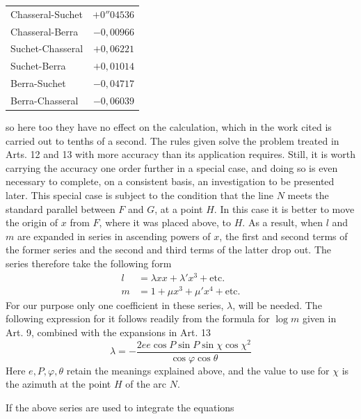 %
\begin{center}
\begin{tabular}{lr}
Chasseral-Suchet&\(+0''04536\)\\
Chasseral-Berra&\(-0{,}00966\)\\
Suchet-Chasseral&\(+0{,}06221\)\\
Suchet-Berra&\(+0{,}01014\)\\
Berra-Suchet&\(-0{,}04717\)\\
Berra-Chasseral&\(-0{,}06039\)
\end{tabular}
\end{center}
so here too they have no effect on the calculation, which in the work cited is carried out to tenths of a second.
The rules given solve the problem treated in Arts. 12 and 13 with more accuracy than its application requires. Still, it is worth carrying the accuracy one order further in a special case, and doing so is even necessary to complete, on a consistent basis, an investigation to be presented later. This special case is subject to the condition that the line \(N\) meets the standard parallel between \(F\) and \(G\), at a point \(H\). In this case it is better to move the origin of \(x\) from \(F\), where it was placed above, to \(H\). As a result, when \(l\) and \(m\) are expanded in series in ascending powers of \(x\), the first and second terms of the former series and the second and third terms of the latter drop out. The series therefore take the following form
\[
\begin{aligned}
l&=\lambda xx+\lambda'x^3+\text{etc.}\\
m&=1+\mu x^3+\mu'x^4+\text{etc.}
\end{aligned}
\]
\indent For our purpose only one coefficient in these series, \(\lambda\), will be needed. The following expression for it follows readily from the formula for \(\log m\) given in Art. 9, combined with the expansions in Art. 13
\[
\lambda=-\frac{2ee\cos P\sin P\sin\chi\cos\chi^2}{\cos\varphi\cos\theta}
\]
Here \(e,P,\varphi,\theta\) retain the meanings explained above, and the value to use for \(\chi\) is the azimuth at the point \(H\) of the arc \(N\).

If the above series are used to integrate the equations
